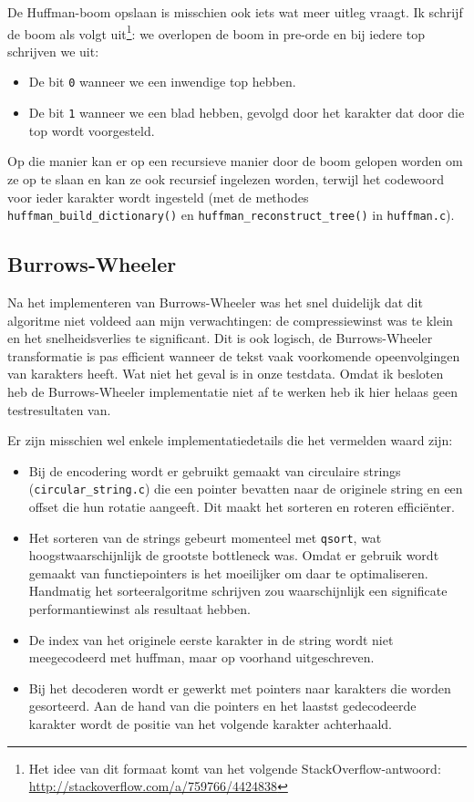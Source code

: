 \documentclass[a4paper]{article}
\begin{document}
De Huffman-boom opslaan is misschien ook iets wat meer uitleg vraagt. Ik schrijf de boom als volgt uit\footnote{Het idee van dit formaat komt van het volgende StackOverflow-antwoord: \url{http://stackoverflow.com/a/759766/4424838}}: we overlopen de boom in pre-orde en bij iedere top schrijven we uit:
\begin{itemize}
    \item De bit \texttt{0} wanneer we een inwendige top hebben.
    \item De bit \texttt{1} wanneer we een blad hebben, gevolgd door het karakter dat door die top wordt voorgesteld.
\end{itemize}
Op die manier kan er op een recursieve manier door de boom gelopen worden om ze op te slaan en kan ze ook recursief ingelezen worden, terwijl het codewoord voor ieder karakter wordt ingesteld (met de methodes \texttt{huffman\_build\_dictionary()} en \texttt{huffman\_reconstruct\_tree()} in \texttt{huffman.c}).


\subsection{Burrows-Wheeler}

Na het implementeren van Burrows-Wheeler was het snel duidelijk dat dit algoritme niet voldeed aan mijn verwachtingen: de compressiewinst was te klein en het snelheidsverlies te significant. Dit is ook logisch, de Burrows-Wheeler transformatie is pas efficient wanneer de tekst vaak voorkomende opeenvolgingen van karakters heeft. Wat niet het geval is in onze testdata. Omdat ik besloten heb de Burrows-Wheeler implementatie niet af te werken heb ik hier helaas geen testresultaten van.

Er zijn misschien wel enkele implementatiedetails die het vermelden waard zijn:
\begin{itemize}
    \item Bij de encodering wordt er gebruikt gemaakt van circulaire strings (\texttt{circular\_string.c}) die een pointer bevatten naar de originele string en een offset die hun rotatie aangeeft. Dit maakt het sorteren en roteren efficiënter.
    \item Het sorteren van de strings gebeurt momenteel met \texttt{qsort}, wat hoogstwaarschijnlijk de grootste bottleneck was. Omdat er gebruik wordt gemaakt van functiepointers is het moeilijker om daar te optimaliseren. Handmatig het sorteeralgoritme schrijven zou waarschijnlijk een significate performantiewinst als resultaat hebben.
    \item De index van het originele eerste karakter in de string wordt niet meegecodeerd met huffman, maar op voorhand uitgeschreven.
    \item Bij het decoderen wordt er gewerkt met pointers naar karakters die worden gesorteerd. Aan de hand van die pointers en het laastst gedecodeerde karakter wordt de positie van het volgende karakter achterhaald.
\end{itemize}
\end{document}
